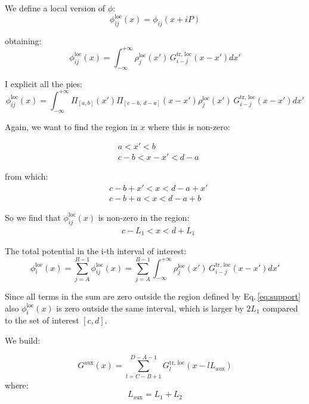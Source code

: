 We define a local version of $\phi$:
\begin{equation}
\phi_{ij}^\text{loc}(x) = \phi_{ij}(x+iP)
\end{equation}

obtaining:
\begin{equation}
\phi_{ij}^\text{loc}(x) = \int_{-\infty}^{+\infty} 
\rho^\text{loc}_j(x')\,G^\text{tr, loc}_{i-j}(x-x') dx'
\end{equation}

I explicit all the pies:
\begin{equation}
\phi_{ij}^\text{loc}(x) = \int_{-\infty}^{+\infty}
\Pi_{[a,b]}(x')
\Pi_{[c-b,~d-a]}(x-x')
\rho^\text{loc}_j(x')\,G^\text{tr, loc}_{i-j}(x-x') dx'
\end{equation}

Again, we want to find the region in $x$ where this is non-zero:

\begin{align}
&a<x'<b\\
&c-b< x-x'<d-a
\end{align}

from which:
\begin{align}
&c-b+x'< x<d-a+x'\\
&c-b+a< x<d-a+b
\end{align}

So we find that $\phi_{ij}^\text{loc}(x)$ is non-zero in the region:
\begin{align}
&c-L_1< x<d+L_1
\label{eq:support}
\end{align}


The total potential in the i-th interval of interest:
\begin{equation}
\phi_{i}^\text{loc}(x)
=\sum_{j=A}^{B-1} \phi_{ij}^\text{loc}(x) = \sum_{j=A}^{B-1}\int_{-\infty}^{+\infty}
\rho^\text{loc}_j(x')\,G^\text{tr, loc}_{i-j}(x-x') dx'
\label{eq:phi_i_loc}
\end{equation}

Since all terms in the sum are zero outside the region defined by Eq.\,\ref{eq:support} also $\phi_{i}^\text{loc}(x)$ is zero outside the same interval, which is larger by $2L_1$ compared to the set of interest $[c, d]$.

We build:

\begin{equation}
G^\text{aux} (x)= \sum_{l=C-B+1}^{D-A-1}
G^\text{tr, loc}_{l}(x-l L_\text{aux})
\label{eq:def_gaux}
\end{equation}
where:
\begin{equation}
L_\text{aux} = L_1 + L_2
\end{equation}

